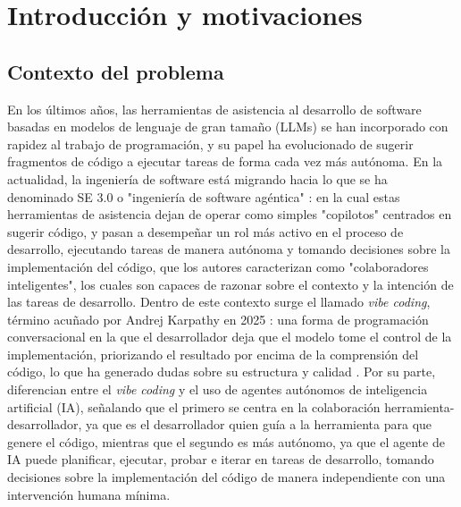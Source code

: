 \section{Introducción y motivaciones}
\label{sec:introduccion}


\subsection{Contexto del problema}
\label{sec:contexto-problema}

En los últimos años, las herramientas de asistencia al desarrollo de software basadas en modelos de lenguaje de gran tamaño (LLMs) se han incorporado con rapidez al trabajo de programación, y su papel ha evolucionado de sugerir fragmentos de código a ejecutar tareas de forma cada vez más autónoma. En la actualidad, la ingeniería de software está migrando hacia lo que se ha denominado SE 3.0 o "ingeniería de software agéntica" \parencite{hassan2026se3}: en la cual estas herramientas de asistencia dejan de operar como simples "copilotos" centrados en sugerir código, y pasan a desempeñar un rol más activo en el proceso de desarrollo, ejecutando tareas de manera autónoma y tomando decisiones sobre la implementación del código, que los autores caracterizan como "colaboradores inteligentes", los cuales son capaces de razonar sobre el contexto y la intención de las tareas de desarrollo. Dentro de este contexto surge el llamado \textit{vibe coding}, término acuñado por Andrej Karpathy en 2025 \parencite{bbc2025vibecoding}: una forma de programación conversacional en la que el desarrollador deja que el modelo tome el control de la implementación, priorizando el resultado por encima de la comprensión del código, lo que ha generado dudas sobre su estructura y calidad \parencite{fernandezyfernandez2026rsm}. Por su parte, \textcite{watanabe2026agenticpr} diferencian entre el \textit{vibe coding} y el uso de agentes autónomos de inteligencia artificial (IA), señalando que el primero se centra en la colaboración herramienta-desarrollador, ya que es el desarrollador quien guía a la herramienta para que genere el código, mientras que el segundo es más autónomo, ya que el agente de IA puede planificar, ejecutar, probar e iterar en tareas de desarrollo, tomando decisiones sobre la implementación del código de manera independiente con una intervención humana mínima.

